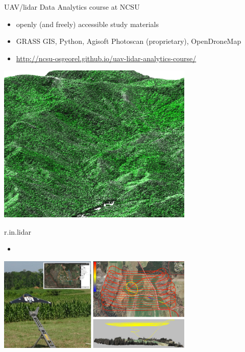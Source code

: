 \documentclass[xcolor={dvipsnames,usenames},beamer,aspectratio=169]{beamer}
\begin{document}
\begin{frame}{UAV/lidar Data Analytics course at NCSU}

\begin{itemize}
  \item openly (and freely) accessible study materials
  \item GRASS GIS, Python, Agisoft Photoscan (proprietary), OpenDroneMap
  \item \url{http://ncsu-osgeorel.github.io/uav-lidar-analytics-course/}
\end{itemize}

\centering
\includegraphics[width=0.7\textwidth]{grass/range_on_smooth_max_larger}%

\end{frame}

\begin{frame}{r.in.lidar}

\begin{itemize}
  \item
\end{itemize}

\centering
\includegraphics[width=0.7\textwidth]{uav_flight_plan}%

\end{frame}
\end{document}
